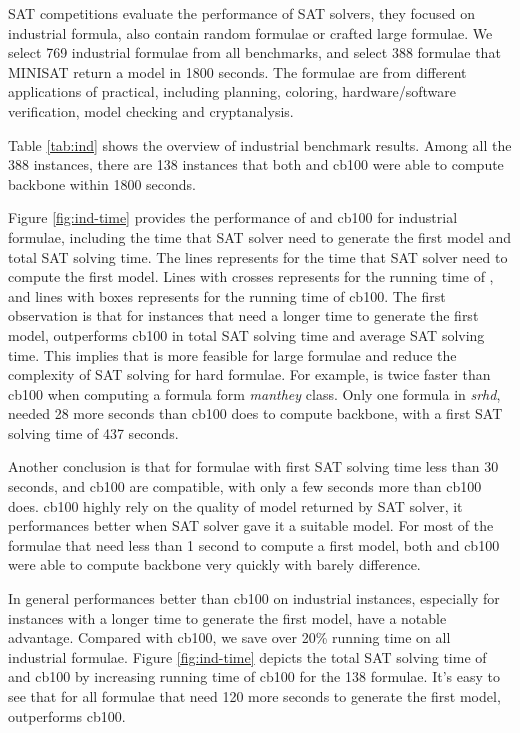 SAT competitions evaluate the performance of SAT solvers, they focused on industrial formula, also contain random formulae or crafted large formulae. We select 769 industrial formulae from all benchmarks, and select 388 formulae that MINISAT return a model in 1800 seconds. The formulae are from different applications of practical, including planning, coloring, hardware/software verification, model checking and cryptanalysis.

Table \ref{tab:ind} shows the overview of industrial benchmark results. Among all the 388 instances, there are 138 instances that both \tool and cb100 were able to compute backbone within 1800 seconds.

Figure \ref{fig:ind-time} provides the performance of \tool and cb100 for industrial formulae, including the time that SAT solver need to generate the first model and total SAT solving time. The lines represents for the time that SAT solver need to compute the first model. Lines with crosses represents for the running time of \tool, and lines with boxes represents for the running time of cb100. The first observation is that for instances that need a longer time to generate the first model, \tool outperforms cb100 in total SAT solving time and average SAT solving time. This implies that \tool is more feasible for large formulae and reduce the complexity of SAT solving for hard formulae. For example, \tool is twice faster than cb100 when computing a formula form \emph{manthey} class. Only one formula in \emph{srhd}, \tool needed 28 more seconds than cb100 does to compute backbone, with a first SAT solving time of 437 seconds.

Another conclusion is that for formulae with first SAT solving time less than 30 seconds, \tool and cb100 are compatible, with only a few seconds more than cb100 does. cb100 highly rely on the quality of model returned by SAT solver, it performances better when SAT solver gave it a suitable model. For most of the formulae that need less than 1 second to compute a first model, both \tool and cb100 were able to compute backbone very quickly with barely difference.

In general \tool performances better than cb100 on industrial instances, especially for instances with a longer time to generate the first model, \tool have a notable advantage. Compared with cb100, we save over 20\% running time on all industrial formulae. Figure \ref{fig:ind-time} depicts the total SAT solving time of \tool and cb100 by increasing running time of cb100 for the 138 formulae. It's easy to see that for all formulae that need 120 more seconds to generate the first model, \tool outperforms cb100.

